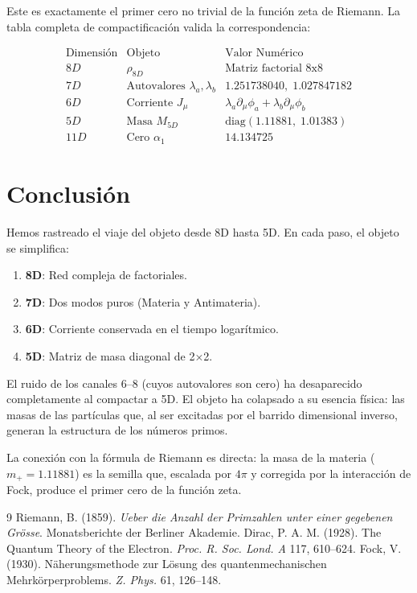 \documentclass[12pt,a4paper]{article}
\begin{document}
Este es exactamente el primer cero no trivial de la función zeta de Riemann. La tabla completa de compactificación valida la correspondencia:

\[
\begin{array}{c|c|c}
\text{Dimensión} & \text{Objeto} & \text{Valor Numérico} \\
\hline
8D & \rho_{8D} & \text{Matriz factorial 8x8} \\
7D & \text{Autovalores } \lambda_a, \lambda_b & 1.251738040,\; 1.027847182 \\
6D & \text{Corriente } J_\mu & \lambda_a \partial_\mu \phi_a + \lambda_b \partial_\mu \phi_b \\
5D & \text{Masa } M_{5D} & \text{diag}(1.11881,\; 1.01383) \\
11D & \text{Cero } \alpha_1 & 14.134725
\end{array}
\]

\section{Conclusión}

Hemos rastreado el viaje del objeto desde 8D hasta 5D. En cada paso, el objeto se simplifica:

\begin{enumerate}
\item \textbf{8D}: Red compleja de factoriales.
\item \textbf{7D}: Dos modos puros (Materia y Antimateria).
\item \textbf{6D}: Corriente conservada en el tiempo logarítmico.
\item \textbf{5D}: Matriz de masa diagonal de 2×2.
\end{enumerate}

El ruido de los canales 6--8 (cuyos autovalores son cero) ha desaparecido completamente al compactar a 5D. El objeto ha colapsado a su esencia física: las masas de las partículas que, al ser excitadas por el barrido dimensional inverso, generan la estructura de los números primos.

La conexión con la fórmula de Riemann es directa: la masa de la materia (\(m_+ = 1.11881\)) es la semilla que, escalada por \(4\pi\) y corregida por la interacción de Fock, produce el primer cero de la función zeta.

\begin{thebibliography}{9}
 Riemann, B. (1859). \emph{Ueber die Anzahl der Primzahlen unter einer gegebenen Grösse}. Monatsberichte der Berliner Akademie.
 Dirac, P. A. M. (1928). The Quantum Theory of the Electron. \emph{Proc. R. Soc. Lond. A} 117, 610--624.
 Fock, V. (1930). Näherungsmethode zur Lösung des quantenmechanischen Mehrkörperproblems. \emph{Z. Phys.} 61, 126--148.
\end{thebibliography}
\end{document}
